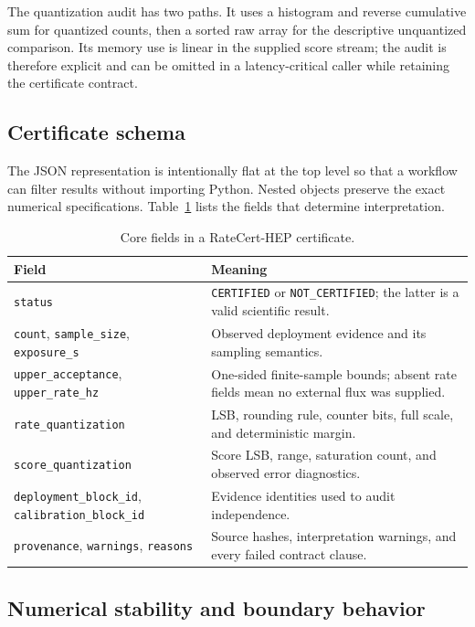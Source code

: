 \documentclass[submission, Phys]{SciPost}
\begin{document}
The quantization audit has two paths.  It uses a histogram and reverse
cumulative sum for quantized counts, then a sorted raw array for the descriptive
unquantized comparison.  Its memory use is linear in the supplied score stream;
the audit is therefore explicit and can be omitted in a latency-critical
caller while retaining the certificate contract.

\subsection{Certificate schema}

The JSON representation is intentionally flat at the top level so that a
workflow can filter results without importing Python.  Nested objects preserve
the exact numerical specifications.  Table~\ref{tab:schema} lists the fields
that determine interpretation.

\begin{table}[t]
\centering\small
\caption{Core fields in a RateCert-HEP certificate.}
\label{tab:schema}
\begin{tabular}{p{}p{}}
\toprule
Field & Meaning \\
\midrule
\texttt{status} & \texttt{CERTIFIED} or \texttt{NOT\_CERTIFIED}; the latter is a valid scientific result. \\
\texttt{count}, \texttt{sample\_size}, \texttt{exposure\_s} & Observed deployment evidence and its sampling semantics. \\
\texttt{upper\_acceptance}, \texttt{upper\_rate\_hz} & One-sided finite-sample bounds; absent rate fields mean no external flux was supplied. \\
\texttt{rate\_quantization} & LSB, rounding rule, counter bits, full scale, and deterministic margin. \\
\texttt{score\_quantization} & Score LSB, range, saturation count, and observed error diagnostics. \\
\texttt{deployment\_block\_id}, \texttt{calibration\_block\_id} & Evidence identities used to audit independence. \\
\texttt{provenance}, \texttt{warnings}, \texttt{reasons} & Source hashes, interpretation warnings, and every failed contract clause. \\
\bottomrule
\end{tabular}
\end{table}

\subsection{Numerical stability and boundary behavior}
\end{document}
